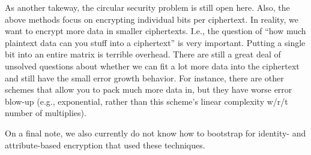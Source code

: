 \documentclass[11pt]{article}
\begin{document}
As another takeway, the circular security problem is still open here. Also, the above methods focus on encrypting individual bits per ciphertext. In reality, we want to encrypt more data in smaller ciphertexts. I.e., the question of ``how much plaintext data can you stuff into a ciphertext'' is very important. Putting a single bit into an entire matrix is terrible overhead. There are still a great deal of unsolved questions about whether we can fit a lot more data into the ciphertext and still have the small error growth behavior. For instance, there are other schemes that allow you to pack much more data in, but they have worse error blow-up (e.g., exponential, rather than this scheme's linear complexity w/r/t number of multiplies).

On a final note, we also currently do not know how to bootstrap for identity- and attribute-based encryption that used these techniques.
\end{document}
